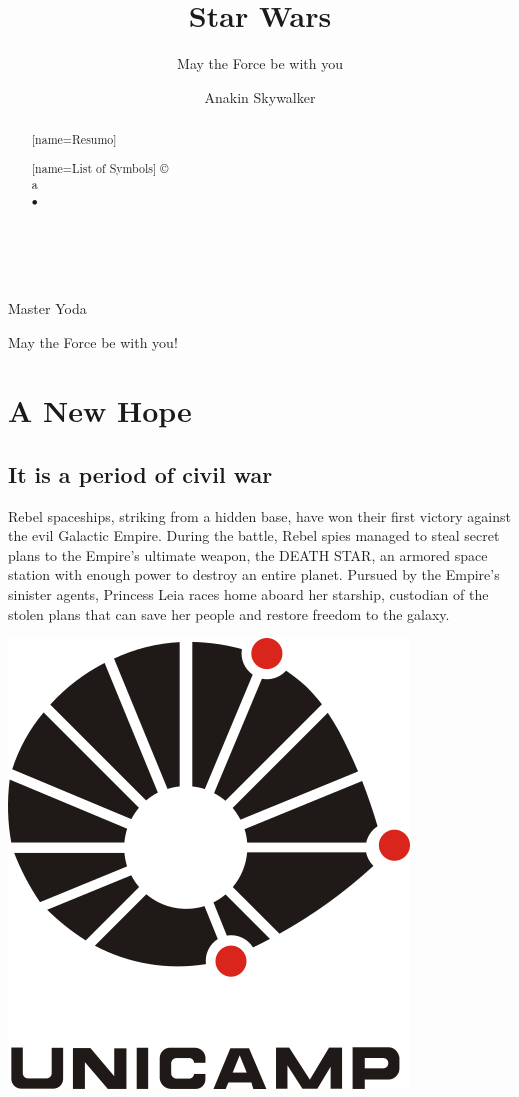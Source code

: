 \documentclass[oneside]{ifgw}
\author{Anakin Skywalker}
\institute[Instituto Darth Plagueis]{Darth Plagueis Institute}
\title[Guerra nas estrelas]{Star Wars}
\subtitle[Que a Força esteja com você]{May the Force be with you}
\begin{document}
\maketitle
\makebackcover
\dedication{To my son, Luke Skywalker.}
\epigraph{Master Yoda}{May the Force be with you!}


\begin{abstract}[name=Resumo]
\lipsum[1]
\end{abstract}

\begin{abstract}
\lipsum[1]
\end{abstract}

\tableofcontents

\begin{abstract}[name=List of Symbols]
\noindent
\copyright\\
\textcircled{a}\\
$\bullet$ \\
\textregistered\\
\texttrademark\\

\end{abstract}


\chapter{A New Hope}
\section{It is a period of civil war}

Rebel spaceships, striking from a hidden base, have won their first victory against the evil Galactic Empire.  During the battle, Rebel spies managed to steal secret plans to the Empire's ultimate weapon, the DEATH STAR, an armored space station with enough power to destroy an entire planet. Pursued by the Empire's sinister agents, Princess Leia races home aboard her starship, custodian of the stolen plans that can save her people and restore freedom to the galaxy.

\lipsum[1-3]


\begin{center}
\includegraphics[width=.35\textwidth]{Images/unicamp.png}
\end{center}
\end{document}
